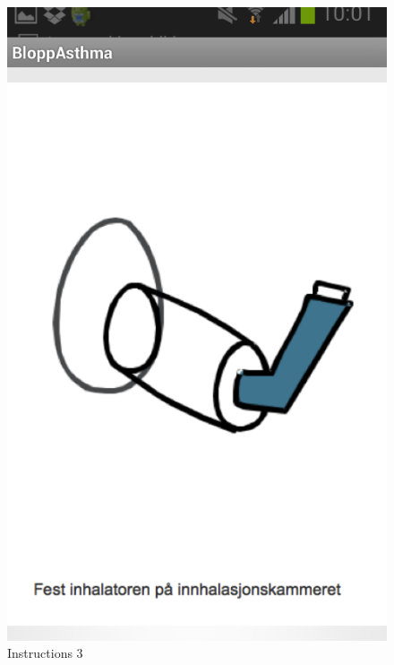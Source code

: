 \begin{figure}
\begin{minipage}[b]{0.3\linewidth}
		\includegraphics[width=0.20\paperwidth]{Pictures/app-screenshots/instructions-3.png}
		\caption{Instructions 3}
		\label{fig:instructions-3}
	\end{minipage}
	

\end{figure}
